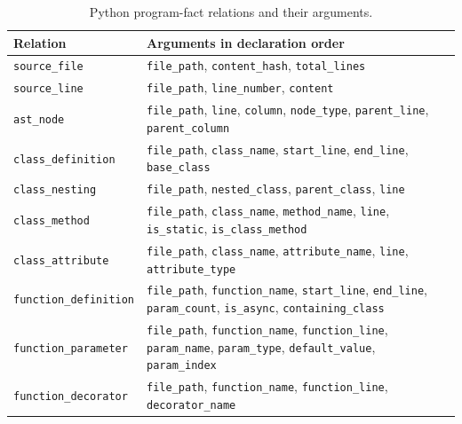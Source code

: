 \begin{table}[htbp]
\centering
\caption{Python program-fact relations and their arguments.}
\label{tab:dataloc-fact-schema}
\begingroup
{}
\fontsize{9.5}{11}\selectfont
\renewcommand{\arraystretch}{1.05}
\setlength{\tabcolsep}{6pt}
\begin{tabularx}{\linewidth}{@{}l>{\raggedright\arraybackslash}X@{}}
\toprule
Relation & Arguments in declaration order \\
\midrule
\texttt{source\_file} & \mbox{\texttt{file\_path}}, \mbox{\texttt{content\_hash}}, \mbox{\texttt{total\_lines}} \\
\texttt{source\_line} & \mbox{\texttt{file\_path}}, \mbox{\texttt{line\_number}}, \mbox{\texttt{content}} \\
\texttt{ast\_node} & \mbox{\texttt{file\_path}}, \mbox{\texttt{line}}, \mbox{\texttt{column}}, \mbox{\texttt{node\_type}}, \mbox{\texttt{parent\_line}}, \mbox{\texttt{parent\_column}} \\
\texttt{class\_definition} & \mbox{\texttt{file\_path}}, \mbox{\texttt{class\_name}}, \mbox{\texttt{start\_line}}, \mbox{\texttt{end\_line}}, \mbox{\texttt{base\_class}} \\
\texttt{class\_nesting} & \mbox{\texttt{file\_path}}, \mbox{\texttt{nested\_class}}, \mbox{\texttt{parent\_class}}, \mbox{\texttt{line}} \\
\texttt{class\_method} & \mbox{\texttt{file\_path}}, \mbox{\texttt{class\_name}}, \mbox{\texttt{method\_name}}, \mbox{\texttt{line}}, \mbox{\texttt{is\_static}}, \mbox{\texttt{is\_class\_method}} \\
\texttt{class\_attribute} & \mbox{\texttt{file\_path}}, \mbox{\texttt{class\_name}}, \mbox{\texttt{attribute\_name}}, \mbox{\texttt{line}}, \mbox{\texttt{attribute\_type}} \\
\texttt{function\_definition} & \mbox{\texttt{file\_path}}, \mbox{\texttt{function\_name}}, \mbox{\texttt{start\_line}}, \mbox{\texttt{end\_line}}, \mbox{\texttt{param\_count}}, \mbox{\texttt{is\_async}}, \mbox{\texttt{containing\_class}} \\
\texttt{function\_parameter} & \mbox{\texttt{file\_path}}, \mbox{\texttt{function\_name}}, \mbox{\texttt{function\_line}}, \mbox{\texttt{param\_name}}, \mbox{\texttt{param\_type}}, \mbox{\texttt{default\_value}}, \mbox{\texttt{param\_index}} \\
\texttt{function\_decorator} & \mbox{\texttt{file\_path}}, \mbox{\texttt{function\_name}}, \mbox{\texttt{function\_line}}, \mbox{\texttt{decorator\_name}} \\

\end{tabularx}
\end{table}
